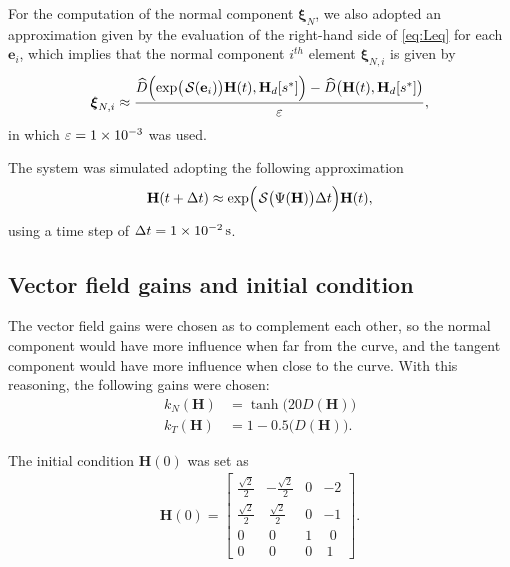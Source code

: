 For the computation of the normal component $\boldsymbol{\xi}_N$, we also adopted an approximation given by the evaluation of the right-hand side of \eqref{eq:Leq} for each $\mathbf{e}_i$, which implies that the normal component $i^{th}$ element $\boldsymbol{\xi}_{N,i}$ is given by
\begin{align}
    \boldsymbol{\xi}_{N,i} \approx \frac{\widehat{D}\Bigl(\exp\bigl(\SL[\boldsymbol{\mathbf{e}}_i]\bigr)\mathbf{H}(t), \mathbf{H}_d[s^*]\Bigr) - \widehat{D}\bigl(\mathbf{H}(t), \mathbf{H}_d[s^*]\bigr)}{\varepsilon},
\end{align} 
in which $\varepsilon = \num{1E-3}$ was used.

The system was simulated adopting the following approximation
\begin{align}
    \mathbf{H}(t + \Delta t) \approx \exp\Bigl(\SL\bigl(\Psi(\mathbf{H})\bigr)\Delta t\Bigr)\mathbf{H}(t),
\end{align}
using a time step of $\Delta t = \qty{1E-2}{\second}$. 
\subsection{Vector field gains and initial condition}
The vector field gains were chosen as to complement each other, so the normal component would have more influence when far from the curve, and the tangent component would have more influence when close to the curve. With this reasoning, the following gains were chosen:
\begin{align}
    k_N(\mathbf{H}) &= \tanh\bigl(20D(\mathbf{H})\bigr)\\
    k_T(\mathbf{H}) &= 1 - 0.5\bigl(D(\mathbf{H})\bigr).
\end{align}

The initial condition $\mathbf{H}(0)$ was set as
\begin{align}
    \mathbf{H}(0) = \begin{bmatrix}
        \frac{\sqrt{2}}{2} & -\frac{\sqrt{2}}{2} & 0 & -2\\
        \frac{\sqrt{2}}{2} & \ \frac{\sqrt{2}}{2} & 0 & -1\\
        0 & \ 0 & 1 & \ \ 0\\
        0 & \ 0 & 0 & \ 1
    \end{bmatrix}.
\end{align}
